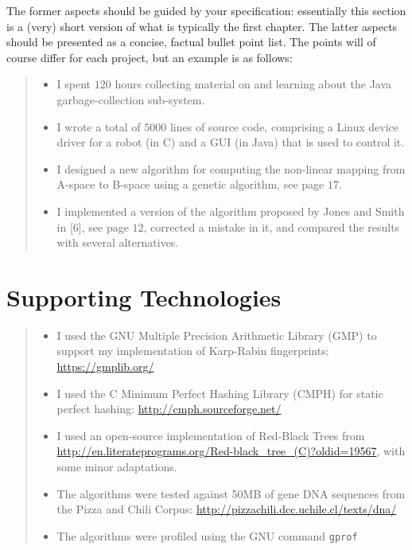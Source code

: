 \documentclass[ %
                    author={Dominic Joseph Moylett},
                    degree={MEng},
                     title={Dictionary Matching with Fingerprints},
                  subtitle={An Empirical Analysis},
                      type={research},
                      year={2015} ]{dissertation}
\begin{document}
The former aspects should be guided by your specification: essentially 
this section is a (very) short version of what is typically the first 
chapter.  The latter aspects should be presented as a concise, factual 
bullet point list.  The points will of course differ for each project, 
but an example is as follows:

\begin{quote}
\noindent
\begin{itemize}
\item I spent $120$ hours collecting material on and learning about the 
      Java garbage-collection sub-system. 
\item I wrote a total of $5000$ lines of source code, comprising a Linux 
      device driver for a robot (in C) and a GUI (in Java) that is 
      used to control it.
\item I designed a new algorithm for computing the non-linear mapping 
      from A-space to B-space using a genetic algorithm, see page $17$.
\item I implemented a version of the algorithm proposed by Jones and 
      Smith in [6], see page $12$, corrected a mistake in it, and 
      compared the results with several alternatives.
\end{itemize}
\end{quote}

\chapter*{Supporting Technologies}

\begin{quote}
\begin{itemize}
\item I used the GNU Multiple Precision Arithmetic Library (GMP) to support my implementation of Karp-Rabin fingerprints: \url{https://gmplib.org/}
\item I used the C Minimum Perfect Hashing Library (CMPH) for static perfect hashing: \url{http://cmph.sourceforge.net/}
\item I used an open-source implementation of Red-Black Trees from \url{http://en.literateprograms.org/Red-black_tree_(C)?oldid=19567}, with some minor adaptations.
\item The algorithms were tested against 50MB of gene DNA sequences from the Pizza and Chili Corpus: \url{http://pizzachili.dcc.uchile.cl/texts/dna/}
\item The algorithms were profiled using the GNU command \texttt{gprof}
\end{itemize}
\end{quote}
\end{document}
